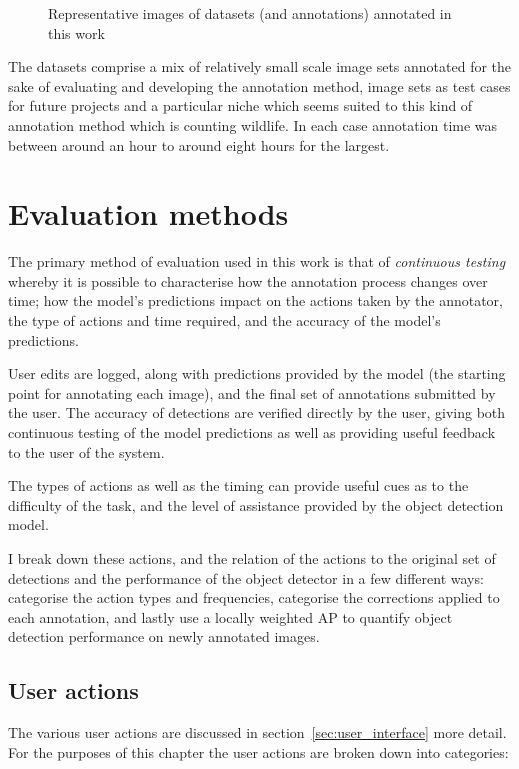 \begin{figure}[h!]
\caption{Representative images of datasets (and annotations) annotated in this work}
\label{fig:datasets_all}
\end{figure}

The datasets comprise a mix of relatively small scale image sets annotated for the sake of evaluating and developing the annotation method, image sets as test cases for future projects and a particular niche which seems suited to this kind of annotation method which is counting wildlife. In each case annotation time was between around an hour to around eight hours for the largest.





\section {Evaluation methods}
\label{sec:ann_evaluation}

The primary method of evaluation used in this work is that of \emph{continuous testing} whereby it is possible to characterise how the annotation process changes over time; how the model's predictions impact on the actions taken by the annotator, the type of actions and time required, and the accuracy of the model's predictions.

User edits are logged, along with predictions provided by the model (the starting point for annotating each image), and the final set of annotations submitted by the user. The accuracy of detections are verified directly by the user, giving both continuous testing of the model predictions as well as providing useful feedback to the user of the system. 

The types of actions as well as the timing can provide useful cues as to the difficulty of the task, and the level of assistance provided by the object detection model. 

I break down these actions, and the relation of the actions to the original set of detections and the performance of the object detector in a few different ways: categorise the action types and frequencies, categorise the corrections applied to each annotation, and lastly use a locally weighted \gls{AP} to quantify object detection performance on newly annotated images.

\subsection{User actions}

The various user actions are discussed in section~\ref{sec:user_interface} more detail. For the purposes of this chapter the user actions are broken down into categories:

